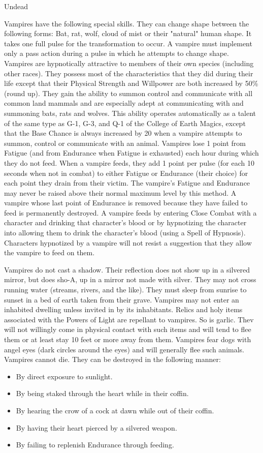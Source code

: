 \begin{mmgroup}{Undead}
\begin{description}
Vampires have the following special skills. They can change shape
between the following forms: Bat, rat, wolf, cloud of mist or their
"natural" human shape. It takes one full pulse for the transformation
to occur. A vampire must implement only a pass action during a pulse
in which he attempts to change shape. Vampires are hypnotically
attractive to members of their own species (including other races).
They possess most of the characteristics that they did during their
life except that their Physical Strength and Willpower are both
increased by 50\% (round up). They gain the ability to summon control
and communicate with all common land mammals and are especially adept
at communicating with and summoning bats, rats and wolves. This
ability operates automatically as a talent of the same type as G-1,
G-3, and Q-1 of the College of Earth Magics, except that the Base
Chance is always increased by 20 when a vampire attempts to summon,
control or communicate with an animal.  Vampires lose 1 point from
Fatigue (and from Endurance when Fatigue is exhausted) each hour
during which they do not feed.  When a vampire feeds, they add 1 point
per pulse (for each 10 seconds when not in combat) to either Fatigue
or Endurance (their choice) for each point they drain from their
victim. The vampire's Fatigue and Endurance may never be raised above
their normal maximum level by this method. A vampire whose last point
of Endurance is removed because they have failed to feed is
permanently destroyed. A vampire feeds by entering Close Combat with a
character and drinking that character's blood or by hypnotizing the
character into allowing them to drink the character's blood (using a
Spell of Hypnosis). Characters hypnotized by a vampire will not resist
a suggestion that they allow the vampire to feed on them.

Vampires do not cast a shadow. Their reflection does not show up in a
silvered mirror, but does sho-A, up in a mirror not made with
silver. They may not cross running water (streams, rivers, and the
like). They must sleep from sunrise to sunset in a bed of earth taken
from their grave. Vampires may not enter an inhabited dwelling unless
invited in by its inhabitants.  Relics and holy items associated with
the Powers of Light are repellant to vampires. So is garlic.  Thev
will not willingly come in physical contact with such items and will
tend to flee them or at least stay 10 feet or more away from them.
Vampires fear dogs with angel eyes (dark circles around the eyes) and
will generally flee such animals.  Vampires cannot die.  They can be
destroyed in the following manner:
\begin{itemize}
\item
 By direct exposure to sunlight.
\item
 By being staked through the heart while in their coffin.
\item
 By hearing the crow of a cock at dawn while out of their coffin.
\item
 By having their heart pierced by a silvered weapon.
\item
 By failing to replenish Endurance through feeding.
\end{itemize}



\end{description}
\end{mmgroup}
